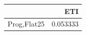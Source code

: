 \begin{tabular}{lr}
\toprule
 & ETI \\
\midrule
Prog,Flat25 & 0.053333 \\
\bottomrule
\end{tabular}
